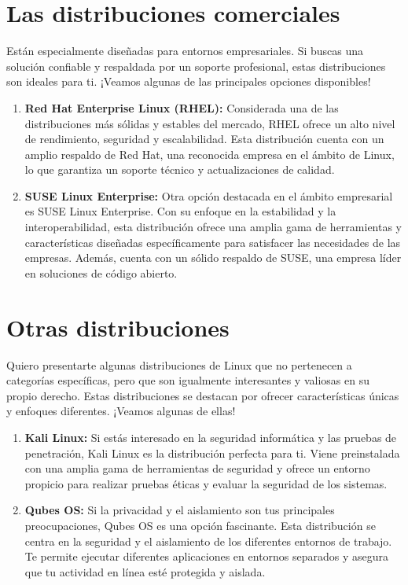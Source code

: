 \documentclass[
  jou,
  floatsintext,
  longtable,
  a4paper,
  nolmodern,
  notxfonts,
  notimes,
  colorlinks=true,linkcolor=blue,citecolor=blue,urlcolor=blue]{apa7}
\begin{document}
\section{Las distribuciones
comerciales}\label{las-distribuciones-comerciales}

Están especialmente diseñadas para entornos empresariales. Si buscas una
solución confiable y respaldada por un soporte profesional, estas
distribuciones son ideales para ti. ¡Veamos algunas de las principales
opciones disponibles!

\begin{enumerate}
\def\labelenumi{\arabic{enumi}.}
\item
  \textbf{Red Hat Enterprise Linux (RHEL):} Considerada una de las
  distribuciones más sólidas y estables del mercado, RHEL ofrece un alto
  nivel de rendimiento, seguridad y escalabilidad. Esta distribución
  cuenta con un amplio respaldo de Red Hat, una reconocida empresa en el
  ámbito de Linux, lo que garantiza un soporte técnico y actualizaciones
  de calidad.
\item
  \textbf{SUSE Linux Enterprise:} Otra opción destacada en el ámbito
  empresarial es SUSE Linux Enterprise. Con su enfoque en la estabilidad
  y la interoperabilidad, esta distribución ofrece una amplia gama de
  herramientas y características diseñadas específicamente para
  satisfacer las necesidades de las empresas. Además, cuenta con un
  sólido respaldo de SUSE, una empresa líder en soluciones de código
  abierto.
\end{enumerate}

\section{Otras distribuciones}\label{otras-distribuciones}

Quiero presentarte algunas distribuciones de Linux que no pertenecen a
categorías específicas, pero que son igualmente interesantes y valiosas
en su propio derecho. Estas distribuciones se destacan por ofrecer
características únicas y enfoques diferentes. ¡Veamos algunas de ellas!

\begin{enumerate}
\def\labelenumi{\arabic{enumi}.}
\item
  \textbf{Kali Linux:} Si estás interesado en la seguridad informática y
  las pruebas de penetración, Kali Linux es la distribución perfecta
  para ti. Viene preinstalada con una amplia gama de herramientas de
  seguridad y ofrece un entorno propicio para realizar pruebas éticas y
  evaluar la seguridad de los sistemas.
\item
  \textbf{Qubes OS:} Si la privacidad y el aislamiento son tus
  principales preocupaciones, Qubes OS es una opción fascinante. Esta
  distribución se centra en la seguridad y el aislamiento de los
  diferentes entornos de trabajo. Te permite ejecutar diferentes
  aplicaciones en entornos separados y asegura que tu actividad en línea
  esté protegida y aislada.
\end{enumerate}
\end{document}

